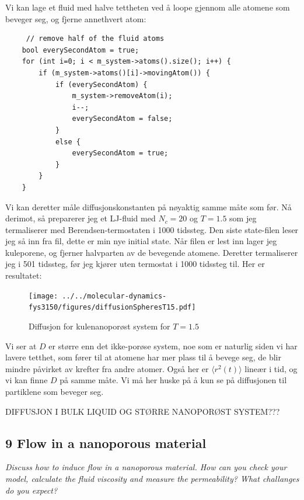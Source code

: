 \documentclass[english, a4paper]{article}
\begin{document}
\noindent
Vi kan lage et fluid med halve tettheten ved å loope gjennom alle atomene som beveger seg, og
fjerne annethvert atom:
\begin{lstlisting}
     // remove half of the fluid atoms
    bool everySecondAtom = true;
    for (int i=0; i < m_system->atoms().size(); i++) {
        if (m_system->atoms()[i]->movingAtom()) {
            if (everySecondAtom) {
                m_system->removeAtom(i);
                i--;
                everySecondAtom = false;
            }
            else {
                everySecondAtom = true;
            }
        }
    }
\end{lstlisting}
Vi kan deretter måle diffusjonskonstanten på nøyaktig samme måte som før. Nå derimot, så preparerer
jeg et LJ-fluid med $N_c = 20$ og $T = 1.5$ som jeg termaliserer med Berendsen-termostaten i 1000 tidssteg.
Den siste state-filen leser jeg så inn fra fil, dette er min nye initial state. Når filen er lest inn 
lager jeg kuleporene, og fjerner halvparten av de bevegende atomene. Deretter termaliserer jeg i 501
tidssteg, før jeg kjører uten termostat i 1000 tidssteg til. Her er resultatet:
\begin{figure}[H]
  \begin{center}
  \texttt{[image: ../../molecular-dynamics-fys3150/figures/diffusionSpheresT15.pdf]}
  \caption{Diffusjon for kulenanoporøst system for $T=1.5$}
  \label{fig:fig7}
  \end{center}
\end{figure}
Vi ser at $D$ er større enn det ikke-porøse system, noe som er naturlig siden vi har lavere tetthet, som 
fører til at atomene har mer plass til å bevege seg, de blir mindre påvirket av krefter fra andre atomer. 
Også her er $\langle r^2(t) \rangle$ lineær i tid, og vi kan finne $D$ på samme måte. Vi må her huske på
å kun se på diffusjonen til partiklene som beveger seg. 

DIFFUSJON I BULK LIQUID OG STØRRE NANOPORØST SYSTEM???


\subsection{9 Flow in a nanoporous material}
\textit{Discuss how to induce flow in a nanoporous material. How can you check your model,
calculate the fluid viscosity and measure the permeability? What challanges do you expect?} \\
\end{document}
